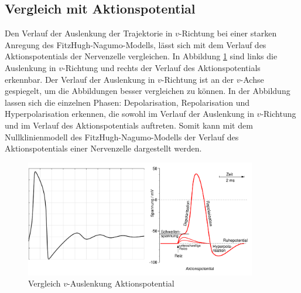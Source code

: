 \begin{refsection}
\subsection{Vergleich mit Aktionspotential}
Den Verlauf der Auslenkung der Trajektorie in $v$-Richtung bei einer starken Anregung des FitzHugh-Nagumo-Modells, lässt
sich mit dem Verlauf des Aktionspotentials der Nervenzelle vergleichen. 
In Abbildung \ref{fig:Vergleich} sind links die Auslenkung in $v$-Richtung und rechts der Verlauf des Aktionspotentials
erkennbar.
Der Verlauf der Auslenkung in $v$-Richtung ist an der $v$-Achse gespiegelt, um die Abbildungen besser vergleichen zu können.
In der Abbildung lassen sich die einzelnen Phasen: Depolarisation, Repolarisation und Hyperpolarisation erkennen, die
sowohl im Verlauf der Auslenkung in $v$-Richtung und im Verlauf des Aktionspotentials auftreten.
Somit kann mit dem Nullklinienmodell des FitzHugh-Nagumo-Modells der Verlauf des Aktionspotentials einer Nervenzelle
dargestellt werden.
\begin{figure}[h]
    \centering
    \includegraphics[width=0.9\textwidth]{papers/nerven/Bilder/Vergleich.png}
    \caption{Vergleich $v$-Auslenkung Aktionspotential}
    \label{fig:Vergleich}
\end{figure}
%
%
%
%
%

\printbibliography[heading=subbibliography]
\end{refsection}
